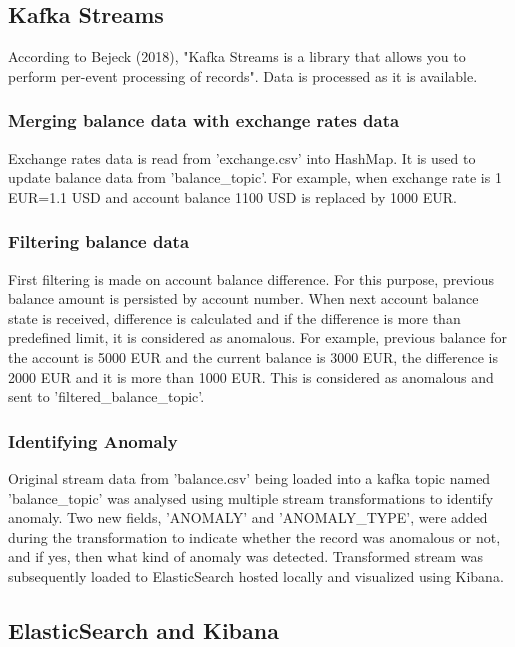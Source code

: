 \documentclass{article}
\begin{document}
\subsection{Kafka Streams}

According to Bejeck (2018), "Kafka Streams is a library that allows you to perform per-event processing of records". Data is processed as it is available.

\subsubsection{Merging balance data with exchange rates data}

Exchange rates data is read from 'exchange.csv' into HashMap. It is used to update balance data from 'balance\_topic'. For example, when exchange rate is 1 EUR=1.1 USD and account balance 1100 USD is replaced by 1000 EUR.

\subsubsection{Filtering balance data}

First filtering is made on account balance difference. For this purpose, previous balance amount is persisted by account number. When next account balance state is received, difference is calculated and if the difference is more than predefined limit, it is considered as anomalous. For example, previous balance for the account is 5000 EUR and the current balance is 3000 EUR, the difference is 2000 EUR and it is more than 1000 EUR. This is considered as anomalous and sent to 'filtered\_balance\_topic'.

\subsubsection{Identifying Anomaly}

Original stream data from 'balance.csv' being loaded into a kafka topic named 'balance\_topic' was analysed using multiple stream transformations to identify anomaly. Two new fields, 'ANOMALY' and 'ANOMALY\_TYPE', were added during the transformation to indicate whether the record was anomalous or not, and if yes, then what kind of anomaly was detected. Transformed stream was subsequently loaded to ElasticSearch hosted locally and visualized using Kibana.

\subsection{ElasticSearch and Kibana}
\end{document}
